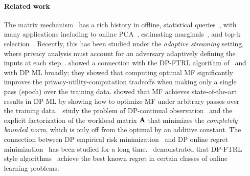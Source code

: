\documentclass{article}
\begin{document}
\paragraph{Related work}
The matrix mechanism~\citep{Li2015TheMM} has a rich history in offline, statistical queries~\citep{hdmm,edmonds_nikolov_ullman,opt_convex_fact,HT10}, with many applications including to online PCA~\cite{dwork2014analyze}, estimating marginals~\cite{edmonds_nikolov_ullman}, and top-k selection~\citep{denisov22matfact}. Recently, this has been studied under the \emph{adaptive streaming} setting, where privacy analysis must account for an adversary adaptively defining the inputs at each step~\citep{fichtenberger_constant22,denisov22matfact}.
\citet{denisov22matfact} showed a connection with the DP-FTRL algorithm of~\citet{kairouz2021practical} and with DP ML broadly; they showed that computing optimal MF significantly improves the privacy-utility-computation tradeoffs when making only a single pass (epoch) over the training data. \citet{choquette2022multi} showed that MF achieves state-of-the-art results in DP ML by showing how to optimize MF under arbitrary passes over the training data.~\citet{henzinger2022constant} study the problem of DP-continual observation~\cite{CSS11-continual,Dwork-continual} and the explicit factorization of the workload matrix $\mathbf{A}$ that minimizes the \emph{completely bounded norm}, which is only off from the optimal by an additive constant. 
%
The connection between DP empirical risk minimization~\cite{chaudhuri2011differentially,kifer2012private,BST14,song2013stochastic,mcmahan2017learning, smith2017interaction, WLKCJN17, iyengar2019towards, song2020characterizing,ChourasiaYS21,bassily2019private,feldman2019private,bassily2020stability,kulkarni2021private,gopi2022private,asi2021adapting,asi2023near,asi2022private} and DP online regret minimization~\cite{JKT-online,guha2013nearly,kairouz2021practical,agarwal2017price,asi2022private,asi2023near} has been studied for a long time.~\citet{asi2023near} demonstrated that DP-FTRL style algorithms~\cite{kairouz2021practical,denisov22matfact} achieve the best known regret in certain classes of online learning problems.
\end{document}
